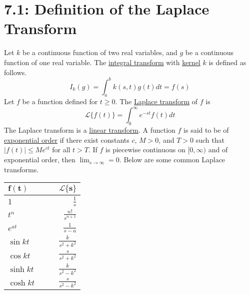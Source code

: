 \documentclass{article}
\newcommand{\lpl}{\mathscr{L}}
\begin{document}
\section*{7.1: Definition of the Laplace Transform}
Let \(k\) be a continuous function of two real variables, and \(g\) be a continuous function of one real variable. The \underline{integral transform} with \underline{kernel} \(k\) is defined as follows.
\[I_k(g)=\int_a^bk(s,t)g(t)dt=f(s)\]
Let \(f\) be a function defined for \(t\geq 0\). The \underline{Laplace transform} of \(f\) is
\[\lpl\{f(t)\}=\int_0^\infty e^{-st}f(t)dt\]
The Laplace transform is a \underline{linear transform}. A function \(f\) is said to be of \underline{exponential order} if there exist constants \(c\), \(M>0\), and \(T>0\) such that \(|f(t)|\leq Me^{ct}\) for all \(t>T\). If \(f\) is piecewise continuous on \([0, \infty)\) and of exponential order, then \(\lim_{s\rightarrow\infty}=0\). Below are some common Laplace transforms.
\newline
\newline
\def\arraystretch{1.5}%
\begin{tabularx}{\textwidth}{l X X r}
\toprule
\(\bm{f(t)}\) &&& \(\bm{\lpl\{s\}}\) \\
\midrule
\(1\) &&& \(\frac{1}{s}\) \\
\(t^n\) &&& \(\frac{n!}{s^{n+1}}\) \\
\(e^{at}\) &&& \(\frac{1}{s-a}\) \\
\(\sin kt\) &&& \(\frac{k}{s^2+k^2}\)\\
\(\cos kt\) &&& \(\frac{s}{s^2+k^2}\)\\
\(\sinh kt\) &&& \(\frac{k}{s^2-k^2}\)\\
\(\cosh kt\) &&& \(\frac{s}{s^2-k^2}\)\\
\bottomrule
\end{tabularx}
\end{document}

